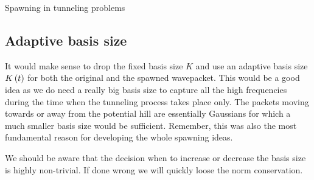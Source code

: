 \begin{chapter}{Spawning in tunneling problems}
\subsection{Adaptive basis size}

It would make sense to drop the fixed basis size $K$ and use an adaptive basis
size $K\left( t \right)$ for both the original and the spawned wavepacket. This would be a
good idea as we do need a really big basis size to capture all the high frequencies
during the time when the tunneling process takes place only. The packets moving
towards or away from the potential hill are essentially Gaussians for which a
much smaller basis size would be sufficient. Remember, this was also the most
fundamental reason for developing the whole spawning ideas.

We should be aware that the decision when to increase or decrease the basis
size is highly non-trivial. If done wrong we will quickly loose the norm
conservation.

\end{chapter}
